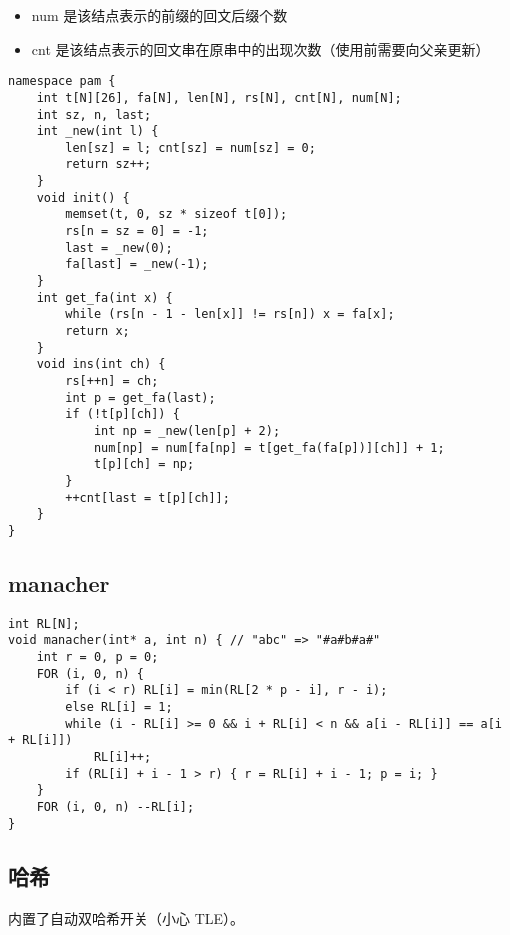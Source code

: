 \documentclass[]{article}
\providecommand{\tightlist}{%
  \setlength{\itemsep}{0pt}\setlength{\parskip}{0pt}}
\begin{document}
\begin{itemize}
\tightlist
\item
  num 是该结点表示的前缀的回文后缀个数
\item
  cnt 是该结点表示的回文串在原串中的出现次数（使用前需要向父亲更新）
\end{itemize}

\begin{verbatim}
namespace pam {
    int t[N][26], fa[N], len[N], rs[N], cnt[N], num[N];
    int sz, n, last;
    int _new(int l) {
        len[sz] = l; cnt[sz] = num[sz] = 0;
        return sz++;
    }
    void init() {
        memset(t, 0, sz * sizeof t[0]);
        rs[n = sz = 0] = -1;
        last = _new(0);
        fa[last] = _new(-1);
    }
    int get_fa(int x) {
        while (rs[n - 1 - len[x]] != rs[n]) x = fa[x];
        return x;
    }
    void ins(int ch) {
        rs[++n] = ch;
        int p = get_fa(last);
        if (!t[p][ch]) {
            int np = _new(len[p] + 2);
            num[np] = num[fa[np] = t[get_fa(fa[p])][ch]] + 1;
            t[p][ch] = np;
        }
        ++cnt[last = t[p][ch]];
    }
}
\end{verbatim}

\hypertarget{manacher}{%
\subsection{manacher}\label{manacher}}

\begin{verbatim}
int RL[N];
void manacher(int* a, int n) { // "abc" => "#a#b#a#"
    int r = 0, p = 0;
    FOR (i, 0, n) {
        if (i < r) RL[i] = min(RL[2 * p - i], r - i);
        else RL[i] = 1;
        while (i - RL[i] >= 0 && i + RL[i] < n && a[i - RL[i]] == a[i + RL[i]])
            RL[i]++;
        if (RL[i] + i - 1 > r) { r = RL[i] + i - 1; p = i; }
    }
    FOR (i, 0, n) --RL[i];
}

\end{verbatim}

\hypertarget{ux54c8ux5e0c}{%
\subsection{哈希}\label{ux54c8ux5e0c}}

内置了自动双哈希开关（小心 TLE）。
\end{document}
